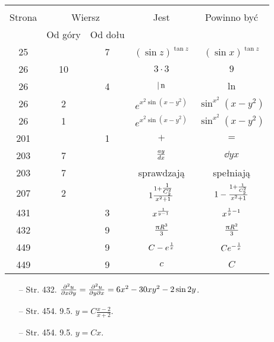 \documentclass[a4paper,11pt]{article}
\begin{document}
\begin{center}
  \begin{tabular}{|c|c|c|c|c|}
    \hline
    & \multicolumn{2}{c|}{} & & \\
    Strona & \multicolumn{2}{c|}{Wiersz} & Jest
                              & Powinno być \\ \cline{2-3}
    & Od góry & Od dołu & & \\
    \hline
    25  & &  7 & $( \sin z )^{ \tan z }$ & $( \sin x )^{ \tan z }$ \\
    26  & 10 & & $3 \cdot 3$ & $9$ \\
    26  & &  4 & $|\, \mathrm{n}$ & $\ln$ \\
    26  &  2 & & $e^{ x^{ 2 } \sin(x - y^{ 2 }) }$
           & $\sin^{ x^{ 2 } }(x - y^{ 2 })$ \\
    26  &  1 & & $e^{ x^{ 2 } \sin(x - y^{ 2 }) }$
           & $\sin^{ x^{ 2 } }(x - y^{ 2 })$ \\
    201 & &  1 & $+$ & $=$ \\
    203 &  7 & & $\frac{ a y }{ d x }$ & $\dd{}{ y }{ x }$ \\
    203 &  7 & & sprawdzają & spełniają \\
    207 &  2 & & $1 \frac{ 1 + \tfrac{ 1 }{ C_{ 2 }^{ 2 } } }
                 { x^{ 2 } + 1 }$
           & $1 - \frac{ 1 + \frac{ 1 }{ C_{ 2 }^{ 2 } } }
             { x^{ 2 } + 1 }$ \\
    431 & &  3 & $x^{ \frac{ 1 }{ y - 1 } }$ & $x^{ \frac{ 1 }{ y } - 1 }$ \\
    432 & &  9 & $\frac{\uppi R^{ 3 } }{ 3 }$ & $\frac{\uppi R^{ 2 } }{ 3 }$ \\
    449 & &  9 & $C - e^{ \frac{ 1 }{ x } }$ & $C e^{ -\frac{ 1 }{ x } }$ \\
    449 & &  9 & $c$ & $C$ \\
    \hline
  \end{tabular}
\end{center}

\begin{itemize}
\item[--] Str. 432.
  $\frac{ \partial^{ 2 } u }{ \partial x \partial y } = \frac{ \partial^{ 2 } u }{ \partial y \partial x
  } = 6 x^{ 2 } - 30 x y^{ 2 } - 2 \sin 2y$.

\item[--] Str. 454. 9.5. $y = C \frac{ x - 2 }{ x + 2 }$.

\item[--] Str. 454. 9.5. $y = C x$.

\end{itemize}
\end{document}

